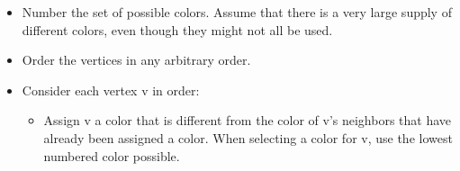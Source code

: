 \documentclass[12pt,a4paper]{article}
\begin{document}
\begin{enumerate}
\begin{itemize}
    \item Number the set of possible colors. Assume that there is a very large supply of different colors, even though they might not all be used.
    \item Order the vertices in any arbitrary order.
    \item Consider each vertex v in order:
    \begin{itemize}
      \item Assign v a color that is different from the color of v's neighbors that have already been assigned a color. When selecting a color for v, use the lowest numbered color possible.
    \end{itemize}
  \end{itemize}
\end{enumerate}


\clearpage
\begin{center}
  \large\textsc{}
\end{center}
\end{document}
